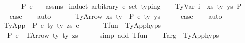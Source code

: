 \begin{isabellebody}
\ \ \ \ \ {\isachardoublequoteopen}{\isasymGamma}\ {\isasymturnstile}{\isacharbraceleft}{\kern0pt}P{\isacharbraceright}{\kern0pt}\ e{\isacharprime}{\kern0pt}\ {\isacharcolon}{\kern0pt}\ {\isasymtau}{\isachardoublequoteclose}\isanewline
%
\isadelimproof
%
\endisadelimproof
%
\isatagproof
{}\isamarkupfalse%
\ assms\isanewline
{}\isamarkupfalse%
\ {\isacharparenleft}{\kern0pt}induct\ arbitrary{\isacharcolon}{\kern0pt}\ e{\isacharprime}{\kern0pt}\ set{\isacharcolon}{\kern0pt}\ typing{\isacharparenright}{\kern0pt}\isanewline
\ \ \isamarkupfalse%
\ {\isacharparenleft}{\kern0pt}TyVar\ i\ {\isasymGamma}\ xs\ ty\ ys\ P{\isacharparenright}{\kern0pt}\isanewline
\ \ \isamarkupfalse%
\ \isamarkupfalse%
\ {\isacharquery}{\kern0pt}case\isanewline
\ \ \isamarkupfalse%
\ auto\isanewline
\ \ \isamarkupfalse%
\isanewline
{}\isamarkupfalse%
\isanewline
\ \ \isamarkupfalse%
\ {\isacharparenleft}{\kern0pt}TyArrow\ xs\ ty{}\ {\isasymGamma}\ P\ e\ ty{}\ ys{\isacharparenright}{\kern0pt}\isanewline
\ \ \isamarkupfalse%
\ \isamarkupfalse%
\ {\isacharquery}{\kern0pt}case\isanewline
\ \ \isamarkupfalse%
\ auto\isanewline
\ \ \isamarkupfalse%
\isanewline
{}\isamarkupfalse%
\isanewline
\ \ \isamarkupfalse%
\ {\isacharparenleft}{\kern0pt}TyApp\ {\isasymGamma}\ P\ e{}\ ty{}\ ty{}\ zs\ e{}{\isacharparenright}{\kern0pt}\isanewline
\ \ \isanewline
\ \ \isamarkupfalse%
\ T{\isacharunderscore}{\kern0pt}fun\ {\isacharequal}{\kern0pt}\ TyApp{\isachardot}{\kern0pt}hyps{\isacharparenleft}{\kern0pt}{}{\isacharparenright}{\kern0pt}\ \ \ \isanewline
\ \ \isamarkupfalse%
\ {\isachardoublequoteopen}{\isasymGamma}\ {\isasymturnstile}{\isacharbraceleft}{\kern0pt}P{\isacharbraceright}{\kern0pt}\ e{}\ {\isacharcolon}{\kern0pt}\ TArrow\ ty{}\ ty{}\ zs{\isachardoublequoteclose}\isanewline
\ \ \ \ \isamarkupfalse%
\ {\isacharparenleft}{\kern0pt}simp\ add{\isacharcolon}{\kern0pt}\ T{\isacharunderscore}{\kern0pt}fun{\isacharparenright}{\kern0pt}\isanewline
\isanewline
\ \ \isamarkupfalse%
\ T{\isacharunderscore}{\kern0pt}arg\ {\isacharequal}{\kern0pt}\ TyApp{\isachardot}{\kern0pt}hyps{\isacharparenleft}{\kern0pt}{}{\isacharparenright}{\kern0pt}\ \ \ \isanewline

\end{isabellebody}
